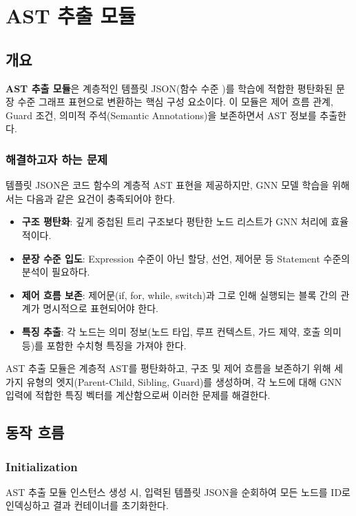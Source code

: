 \clearpage

\section{AST 추출 모듈}

\subsection{개요}
\textbf{AST 추출 모듈}은 계층적인 템플릿 JSON(함수 수준 \abbrAST)를 \abbrGNN 학습에 적합한 평탄화된 문장 수준 그래프 표현으로 변환하는 핵심 구성 요소이다. 이 모듈은 제어 흐름 관계, Guard 조건, 의미적 주석(Semantic Annotations)을 보존하면서 AST 정보를 추출한다.

\subsubsection{해결하고자 하는 문제}
템플릿 JSON은 코드 함수의 계층적 AST 표현을 제공하지만, GNN 모델 학습을 위해서는 다음과 같은 요건이 충족되어야 한다.

\begin{itemize}
    \item \textbf{구조 평탄화}: 깊게 중첩된 트리 구조보다 평탄한 노드 리스트가 GNN 처리에 효율적이다.
\item \textbf{문장 수준 입도}: Expression 수준이 아닌 할당, 선언, 제어문 등 Statement 수준의 분석이 필요하다.
    \item \textbf{제어 흐름 보존}: 제어문(if, for, while, switch)과 그로 인해 실행되는 블록 간의 관계가 명시적으로 표현되어야 한다.
    \item \textbf{특징 추출}: 각 노드는 의미 정보(노드 타입, 루프 컨텍스트, 가드 제약, 호출 의미 등)를 포함한 수치형 특징을 가져야 한다.
\end{itemize}

AST 추출 모듈은 계층적 AST를 평탄화하고, 구조 및 제어 흐름을 보존하기 위해 세 가지 유형의 엣지(Parent-Child, Sibling, Guard)를 생성하며, 각 노드에 대해 GNN 입력에 적합한 특징 벡터를 계산함으로써 이러한 문제를 해결한다.


\subsection{동작 흐름}

\subsubsection{Initialization}
AST 추출 모듈 인스턴스 생성 시, 입력된 템플릿 JSON을 순회하여 모든 노드를 ID로 인덱싱하고 결과 컨테이너를 초기화한다.

